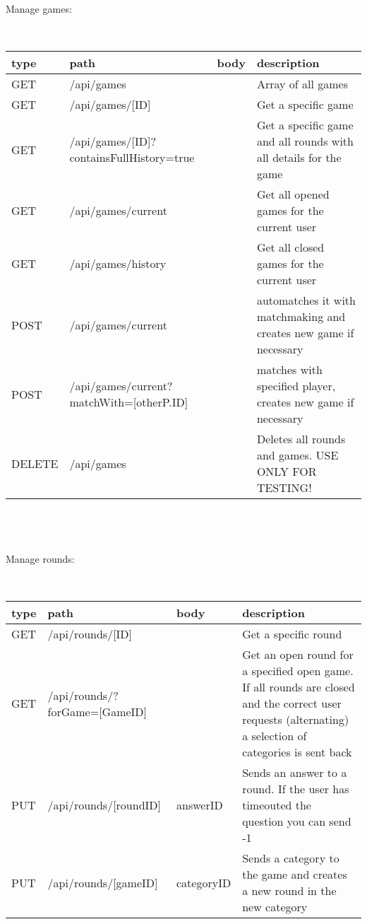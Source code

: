 \noindent Manage games:
\begin{small}
\\ \hspace*{-1cm} \begin{tabular}{|p{1.5cm}| p{4.5cm} | p{2.5cm} | p{6cm} |}
    \hline
    type & path & body & description \\ \hline
    GET & /api/games & & Array of all games \\ \hline
    GET & /api/games/[ID] & & Get a specific game  \\ \hline
    GET & /api/games/[ID]\newline?containsFullHistory=true & & Get a specific game and all rounds with all details for the game  \\ \hline
    GET & /api/games/current & & Get all opened games for the current user  \\ \hline
    GET & /api/games/history & & Get all closed games for the current user  \\ \hline
    POST & /api/games/current & & automatches it with matchmaking and creates new game if necessary \\ \hline
    POST & /api/games/current\newline?matchWith=[otherP.ID] & & matches with specified player, creates new game if necessary \\ \hline
    DELETE & /api/games & & Deletes all rounds and games. USE ONLY FOR TESTING! \\ \hline
   \end{tabular}
\end{small}\\\\\\
\noindent Manage rounds:
\begin{small}
\\ \hspace*{-1cm} \begin{tabular}{|p{1.5cm}| p{4.5cm} | p{2.5cm} | p{6cm} |}
    \hline
    type & path & body & description \\ \hline
    GET & /api/rounds/[ID] & & Get a specific round  \\ \hline
    GET & /api/rounds/\newline?forGame=[GameID] & & Get an open round for a specified open game. If all rounds are closed and the correct user requests (alternating) a selection of categories is sent back  \\ \hline
    PUT & /api/rounds/[roundID] & answerID & Sends an answer to a round. If the user has timeouted the question you can send -1 \\ \hline
    PUT & /api/rounds/[gameID] & categoryID & Sends a category to the game and creates a new round in the new category\\ \hline
    
       \end{tabular}
\end{small}\\\\\\
